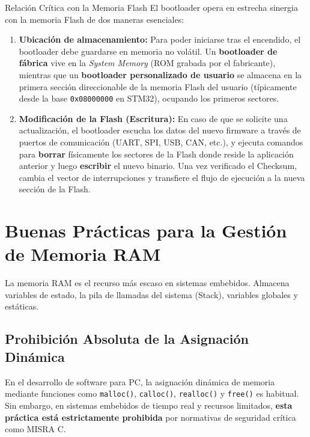 \documentclass[
10pt, %
a4paper, %
oneside, %
headinclude,footinclude, %
BCOR5mm, %
]{scrartcl}
\begin{document}
\begin{WarningBox}{Relación Crítica con la Memoria Flash}
	El bootloader opera en estrecha sinergia con la memoria Flash de dos maneras esenciales:
	\begin{enumerate}
		\item \textbf{Ubicación de almacenamiento:} Para poder iniciarse tras el encendido, el bootloader debe guardarse en memoria no volátil. Un \textbf{bootloader de fábrica} vive en la \textit{System Memory} (ROM grabada por el fabricante), mientras que un \textbf{bootloader personalizado de usuario} se almacena en la primera sección direccionable de la memoria Flash del usuario (típicamente desde la base \texttt{0x08000000} en STM32), ocupando los primeros sectores.
		\item \textbf{Modificación de la Flash (Escritura):} En caso de que se solicite una actualización, el bootloader escucha los datos del nuevo firmware a través de puertos de comunicación (UART, SPI, USB, CAN, etc.), y ejecuta comandos para \textbf{borrar} físicamente los sectores de la Flash donde reside la aplicación anterior y luego \textbf{escribir} el nuevo binario. Una vez verificado el Checksum, cambia el vector de interrupciones y transfiere el flujo de ejecución a la nueva sección de la Flash.
	\end{enumerate}
\end{WarningBox}

\section{Buenas Prácticas para la Gestión de Memoria RAM}

La memoria RAM es el recurso más escaso en sistemas embebidos. Almacena variables de estado, la pila de llamadas del sistema (Stack), variables globales y estáticas.

\subsection{Prohibición Absoluta de la Asignación Dinámica}
En el desarrollo de software para PC, la asignación dinámica de memoria mediante funciones como \texttt{malloc()}, \texttt{calloc()}, \texttt{realloc()} y \texttt{free()} es habitual. Sin embargo, en sistemas embebidos de tiempo real y recursos limitados, \textbf{esta práctica está estrictamente prohibida} por normativas de seguridad crítica como MISRA C.
\end{document}
